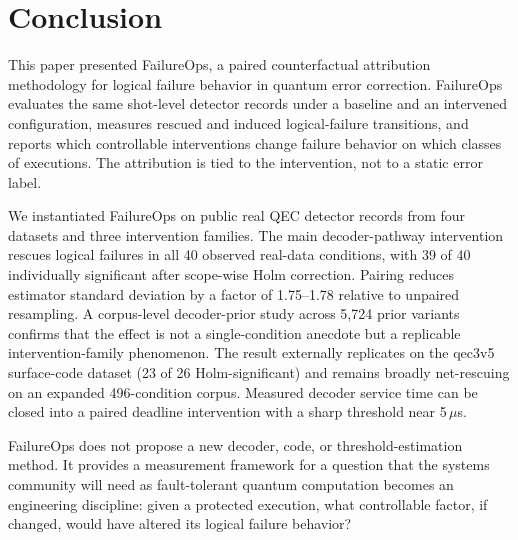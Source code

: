 \section{Conclusion}

This paper presented FailureOps, a paired counterfactual attribution methodology for logical failure behavior in quantum error correction. FailureOps evaluates the same shot-level detector records under a baseline and an intervened configuration, measures rescued and induced logical-failure transitions, and reports which controllable interventions change failure behavior on which classes of executions. The attribution is tied to the intervention, not to a static error label.

We instantiated FailureOps on public real QEC detector records from four datasets and three intervention families. The main decoder-pathway intervention rescues logical failures in all 40 observed real-data conditions, with 39 of 40 individually significant after scope-wise Holm correction. Pairing reduces estimator standard deviation by a factor of 1.75--1.78 relative to unpaired resampling. A corpus-level decoder-prior study across 5,724 prior variants confirms that the effect is not a single-condition anecdote but a replicable intervention-family phenomenon. The result externally replicates on the qec3v5 surface-code dataset (23 of 26 Holm-significant) and remains broadly net-rescuing on an expanded 496-condition corpus. Measured decoder service time can be closed into a paired deadline intervention with a sharp threshold near 5\,$\mu$s.

FailureOps does not propose a new decoder, code, or threshold-estimation method. It provides a measurement framework for a question that the systems community will need as fault-tolerant quantum computation becomes an engineering discipline: given a protected execution, what controllable factor, if changed, would have altered its logical failure behavior?
